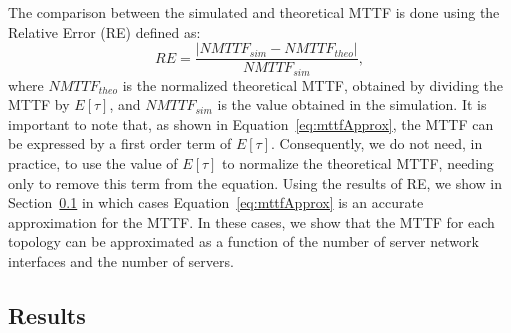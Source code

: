 The comparison between the simulated and theoretical MTTF is done using the Relative Error (RE) defined as:
\begin{equation}
RE = \frac{|NMTTF_{sim} - NMTTF_{theo}|}{NMTTF_{sim}},
\label{eq:relativeError}
\end{equation}
where $NMTTF_{theo}$ is the normalized theoretical MTTF, obtained by dividing the MTTF by $E[\tau]$, and $NMTTF_{sim}$ is the value obtained in the simulation. It is important to note that, as shown in Equation~\ref{eq:mttfApprox}, the MTTF can be expressed by a first order term of $E[\tau]$. Consequently, we do not need, in practice, to use the value of $E[\tau]$ to normalize the theoretical MTTF, needing only to remove this term from the equation.
Using the results of RE, we show in Section~\ref{sec:reliableTimeResults} in which cases Equation~\ref{eq:mttfApprox} is an accurate approximation for the MTTF. In these cases, we show that the MTTF for each topology can be approximated as a function of the number of server network interfaces and the number of servers. 
\subsection{Results}
\label{sec:reliableTimeResults} 

